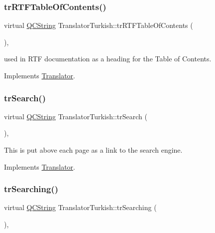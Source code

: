 \mbox{\label{class_translator_turkish_a32ec5a03d3d142df71db4ba2cdf81e34}} 
\subsubsection{\texorpdfstring{trRTFTableOfContents()}{trRTFTableOfContents()}}
{\footnotesize\ttfamily virtual \mbox{\hyperlink{class_q_c_string}{Q\+C\+String}} Translator\+Turkish\+::tr\+R\+T\+F\+Table\+Of\+Contents (\begin{DoxyParamCaption}{ }\end{DoxyParamCaption})\hspace{0.3cm}{\ttfamily [inline]}, {\ttfamily [virtual]}}

used in R\+TF documentation as a heading for the Table of Contents. 

Implements \mbox{\hyperlink{class_translator}{Translator}}.

\mbox{\label{class_translator_turkish_a32cf73b1b3025c40906ed873980887af}} 
\subsubsection{\texorpdfstring{trSearch()}{trSearch()}}
{\footnotesize\ttfamily virtual \mbox{\hyperlink{class_q_c_string}{Q\+C\+String}} Translator\+Turkish\+::tr\+Search (\begin{DoxyParamCaption}{ }\end{DoxyParamCaption})\hspace{0.3cm}{\ttfamily [inline]}, {\ttfamily [virtual]}}

This is put above each page as a link to the search engine. 

Implements \mbox{\hyperlink{class_translator}{Translator}}.

\mbox{\label{class_translator_turkish_ae899bb675e3b8f4a53cefc32b9138575}} 
\subsubsection{\texorpdfstring{trSearching()}{trSearching()}}
{\footnotesize\ttfamily virtual \mbox{\hyperlink{class_q_c_string}{Q\+C\+String}} Translator\+Turkish\+::tr\+Searching (\begin{DoxyParamCaption}{ }\end{DoxyParamCaption})\hspace{0.3cm}{\ttfamily [inline]}, {\ttfamily [virtual]}}

